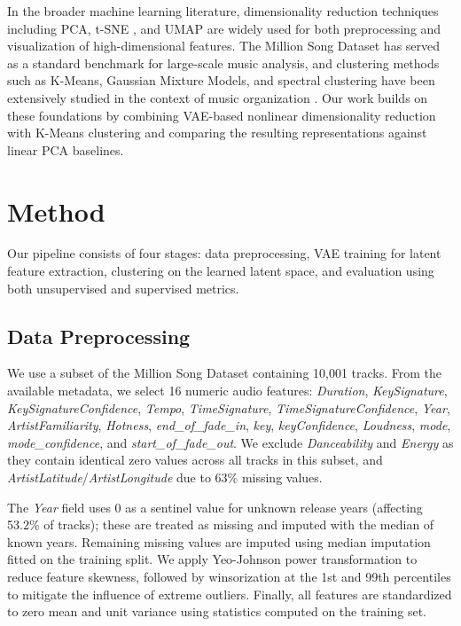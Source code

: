 \documentclass[11pt]{article}
\begin{document}
In the broader machine learning literature, dimensionality reduction techniques including PCA, t-SNE \citep{van2008visualizing}, and UMAP \citep{mcinnes2018umap} are widely used for both preprocessing and visualization of high-dimensional features. The Million Song Dataset \citep{bertin2011million} has served as a standard benchmark for large-scale music analysis, and clustering methods such as K-Means, Gaussian Mixture Models, and spectral clustering have been extensively studied in the context of music organization \citep{mckinney2003features}. Our work builds on these foundations by combining VAE-based nonlinear dimensionality reduction with K-Means clustering and comparing the resulting representations against linear PCA baselines.

\section{Method}

Our pipeline consists of four stages: data preprocessing, VAE training for latent feature extraction, clustering on the learned latent space, and evaluation using both unsupervised and supervised metrics.

\subsection{Data Preprocessing}

We use a subset of the Million Song Dataset containing 10,001 tracks. From the available metadata, we select 16 numeric audio features: \textit{Duration}, \textit{KeySignature}, \textit{KeySignatureConfidence}, \textit{Tempo}, \textit{TimeSignature}, \textit{TimeSignatureConfidence}, \textit{Year}, \textit{ArtistFamiliarity}, \textit{Hotness}, \textit{end\_of\_fade\_in}, \textit{key}, \textit{keyConfidence}, \textit{Loudness}, \textit{mode}, \textit{mode\_confidence}, and \textit{start\_of\_fade\_out}. We exclude \textit{Danceability} and \textit{Energy} as they contain identical zero values across all tracks in this subset, and \textit{ArtistLatitude}/\textit{ArtistLongitude} due to 63\% missing values.

The \textit{Year} field uses 0 as a sentinel value for unknown release years (affecting 53.2\% of tracks); these are treated as missing and imputed with the median of known years. Remaining missing values are imputed using median imputation fitted on the training split. We apply Yeo-Johnson power transformation to reduce feature skewness, followed by winsorization at the 1st and 99th percentiles to mitigate the influence of extreme outliers. Finally, all features are standardized to zero mean and unit variance using statistics computed on the training set.
\end{document}
